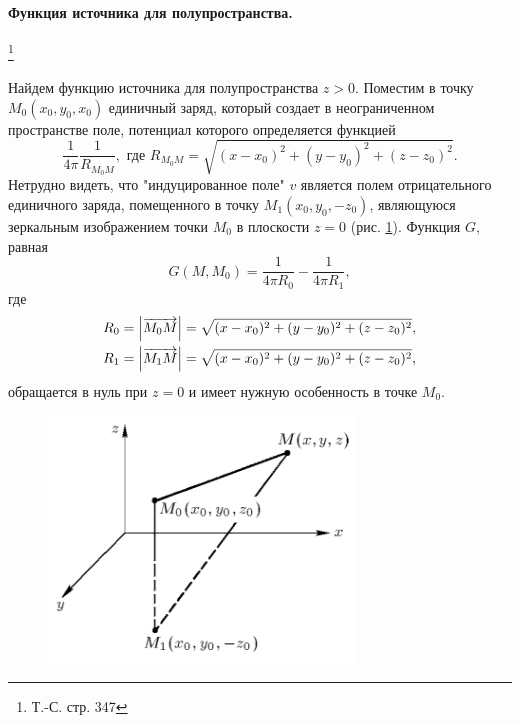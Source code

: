 \paragraph{Функция источника для полупространства.}\footnote{Т.-С. стр. 347}

Найдем функцию источника для полупространства $z > 0$. Поместим в точку $M_0(x_0, y_0, x_0)$ единичный заряд, который создает в неограниченном пространстве поле, потенциал которого определяется функцией 
\begin{equation*}
	\frac{1}{4 \pi} \frac{1}{R_{M_0 M}}, \text{ где } R_{M_0 M} = \sqrt{(x - x_0)^2 + (y - y_0)^2 + (z - z_0)^2}.
\end{equation*}
Нетрудно видеть, что "индуцированное поле" $v$ является полем отрицательного единичного заряда, помещенного в точку $M_1(x_0, y_0, -z_0)$, являющуюся зеркальным изображением точки $M_0$ в плоскости $z = 0$ (рис. \ref{halfdim_green}). 
Функция $G$, равная
\begin{equation*}
	G(M, M_0) = \frac{1}{4 \pi R_0} - \frac{1}{4 \pi R_1},
\end{equation*}
где
\begin{align*}
	R_0 = \abs{\overrightarrow{M_0 M}} = \sqrt{(x - x_0)^2 + (y - y_0)^2 + (z - z_0)^2}, \\
	R_1 = \abs{\overrightarrow{M_1 M}} = \sqrt{(x - x_0)^2 + (y - y_0)^2 + (z - z_0)^2}, \\
\end{align*}
обращается в нуль при $z = 0$ и имеет нужную особенность в точке $M_0$.

\begin{figure}[H]
	\centering
	\includegraphics[width=0.4\linewidth]{img/halfdim_green}
	\caption{}
	\label{halfdim_green}
\end{figure}